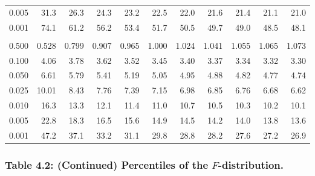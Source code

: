 \documentclass[
]{article}
\begin{document}
\begin{longtable}[t]{lrrrrrrrrrr}
\hspace{1em}0.005 & 31.3 & 26.3 & 24.3 & 23.2 & 22.5 & 22.0 & 21.6 & 21.4 & 21.1 & 21.0\\
\hspace{1em}0.001 & 74.1 & 61.2 & 56.2 & 53.4 & 51.7 & 50.5 & 49.7 & 49.0 & 48.5 & 48.1\\
\addlinespace[0.3em]
\multicolumn{11}{l}{\textbf{$k_2=5$}}\\
\hspace{1em}0.500 & 0.528 & 0.799 & 0.907 & 0.965 & 1.000 & 1.024 & 1.041 & 1.055 & 1.065 & 1.073\\
\hspace{1em}0.100 & 4.06 & 3.78 & 3.62 & 3.52 & 3.45 & 3.40 & 3.37 & 3.34 & 3.32 & 3.30\\
\hspace{1em}0.050 & 6.61 & 5.79 & 5.41 & 5.19 & 5.05 & 4.95 & 4.88 & 4.82 & 4.77 & 4.74\\
\hspace{1em}0.025 & 10.01 & 8.43 & 7.76 & 7.39 & 7.15 & 6.98 & 6.85 & 6.76 & 6.68 & 6.62\\
\hspace{1em}0.010 & 16.3 & 13.3 & 12.1 & 11.4 & 11.0 & 10.7 & 10.5 & 10.3 & 10.2 & 10.1\\
\hspace{1em}0.005 & 22.8 & 18.3 & 16.5 & 15.6 & 14.9 & 14.5 & 14.2 & 14.0 & 13.8 & 13.6\\
\hspace{1em}0.001 & 47.2 & 37.1 & 33.2 & 31.1 & 29.8 & 28.8 & 28.2 & 27.6 & 27.2 & 26.9\\
\bottomrule
\end{longtable}

\newpage

\subsubsection{\texorpdfstring{Table 4.2: (Continued) Percentiles of the
\(F\)-distribution.}{Table 4.2: (Continued) Percentiles of the F-distribution.}}\label{table-4.2-continued-percentiles-of-the-f-distribution.}
\end{document}
